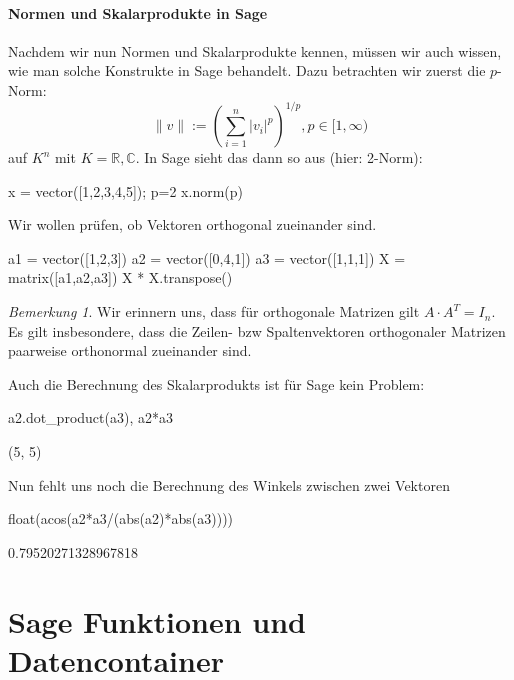 \documentclass[fontsize=12pt,paper=a4,twoside,bibtotoc,idxtotoc,
liststotoc,pagesize,BCOR1.2cm,DIV15,chapterprefix,pagesize=pdftex]{scrbook}
\theoremstyle{plain}
\theoremstyle{definition}
\theoremstyle{remark}
\newtheorem{bem}[equation]{Bemerkung}
\begin{document}
\subsubsection{Normen und Skalarprodukte in Sage}
Nachdem wir nun Normen und Skalarprodukte kennen, müssen wir auch wissen, wie man solche Konstrukte in Sage behandelt. Dazu betrachten wir zuerst die $p$-Norm:
\[
\|v\|:=(\sum_{i=1}^n |v_i|^p)^{1/p}, p\in [1,\infty)                   
\]
auf $K^n$ mit $K=\mathbb{R},\mathbb{C}$. In Sage sieht das dann so aus (hier: 2-Norm):
\begin{sagein}
x = vector([1,2,3,4,5]); p=2
x.norm(p)
\end{sagein}
Wir wollen prüfen, ob Vektoren orthogonal zueinander sind.
\begin{sagein}
a1 = vector([1,2,3])
a2 = vector([0,4,1])
a3 = vector([1,1,1])
X = matrix([a1,a2,a3])
X * X.transpose() 
\end{sagein}
\begin{bem}
 Wir erinnern uns, dass für orthogonale Matrizen gilt $A\cdot A^T=I_n$. Es gilt insbesondere, dass die Zeilen- bzw Spaltenvektoren orthogonaler Matrizen paarweise 
orthonormal zueinander sind.
\end{bem}
Auch die Berechnung des Skalarprodukts ist für Sage kein Problem:
\begin{sagein}
a2.dot_product(a3), a2*a3
\end{sagein}
\begin{sageout}
  (5, 5)
\end{sageout}
Nun fehlt uns noch die Berechnung des Winkels zwischen zwei Vektoren
\begin{sagein}
float(acos(a2*a3/(abs(a2)*abs(a3))))
\end{sagein}
\begin{sageout}
  0.79520271328967818
\end{sageout}
\chapter{Sage Funktionen und Datencontainer}
\end{document}
